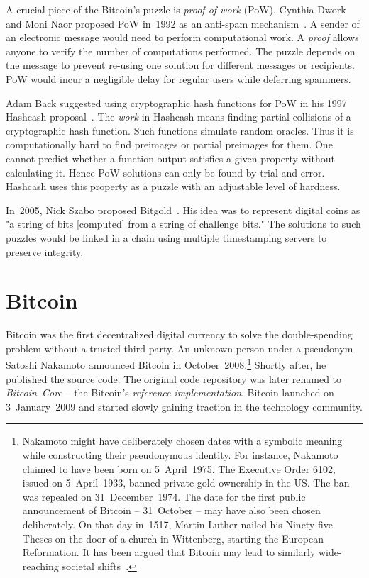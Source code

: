 A crucial piece of the Bitcoin's puzzle is \textit{proof-of-work} (PoW).
Cynthia Dwork and Moni Naor proposed PoW in~1992 as an anti-spam mechanism~\cite{Dwork1992}.
A sender of an electronic message would need to perform computational work.
A \textit{proof} allows anyone to verify the number of computations performed.
The puzzle depends on the message to prevent re-using one solution for different messages or recipients.
PoW would incur a negligible delay for regular users while deferring spammers.

Adam Back suggested using cryptographic hash functions for PoW in his 1997 Hashcash proposal~\cite{Back1997}.
The \textit{work} in Hashcash means finding partial collisions of a cryptographic hash function.
Such functions simulate random oracles.
Thus it is computationally hard to find preimages or partial preimages for them.
One cannot predict whether a function output satisfies a given property without calculating it.
Hence PoW solutions can only be found by trial and error.
Hashcash uses this property as a puzzle with an adjustable level of hardness.

In~2005, Nick Szabo proposed Bitgold~\cite{Szabo2005}.
His idea was to represent digital coins as "a string of bits [computed] from a string of challenge bits."
The solutions to such puzzles would be linked in a chain using multiple timestamping servers to preserve integrity.


\section{Bitcoin}
\label{sec:Bitcoin}

Bitcoin was the first decentralized digital currency to solve the double-spending problem without a trusted third party.
An unknown person under a pseudonym Satoshi Nakamoto announced Bitcoin in October~2008.\footnote{Nakamoto might have deliberately chosen dates with a symbolic meaning while constructing their pseudonymous identity. For instance, Nakamoto claimed to have been born on 5~April~1975. The Executive Order 6102, issued on 5~April~1933, banned private gold ownership in the US\@. The ban was repealed on 31~December~1974. The date for the first public announcement of Bitcoin -- 31~October -- may have also been chosen deliberately. On that day in~1517, Martin Luther nailed his Ninety-five Theses on the door of a church in Wittenberg, starting the European Reformation. It has been argued that Bitcoin may lead to similarly wide-reaching societal shifts~\cite{Demeester2019}.}
Shortly after, he published the source code.
The original code repository was later renamed to \textit{Bitcoin~Core} -- the Bitcoin's \textit{reference implementation}.
Bitcoin launched on 3~January~2009 and started slowly gaining traction in the technology community.

